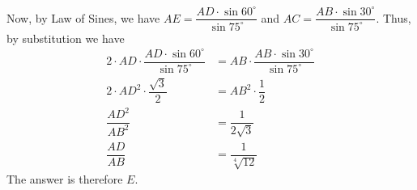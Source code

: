 \begin{enumerate}
 Now, by Law of Sines, we have $AE = \dfrac{AD \cdot \sin 60^\circ}{\sin 75^\circ}$ and $AC = \dfrac{AB \cdot \sin 30 ^\circ}{\sin 75^\circ}$. Thus, by substitution we have\begin{align}2 \cdot AD \cdot \dfrac{AD \cdot \sin 60^\circ}{\sin 75^\circ} &= AB \cdot \dfrac{AB \cdot \sin 30 ^\circ}{\sin 75^\circ}\\2 \cdot AD^2 \cdot \dfrac{\sqrt{3}}2 &= AB^2 \cdot \dfrac 12\\\dfrac{AD^2}{AB^2} &= \dfrac{1}{2\sqrt{3}}\\\dfrac{AD}{AB} &= \dfrac{1}{\sqrt[4]{12}}\end{align}The answer is therefore $\boxed{E}$.

 


\end{enumerate}